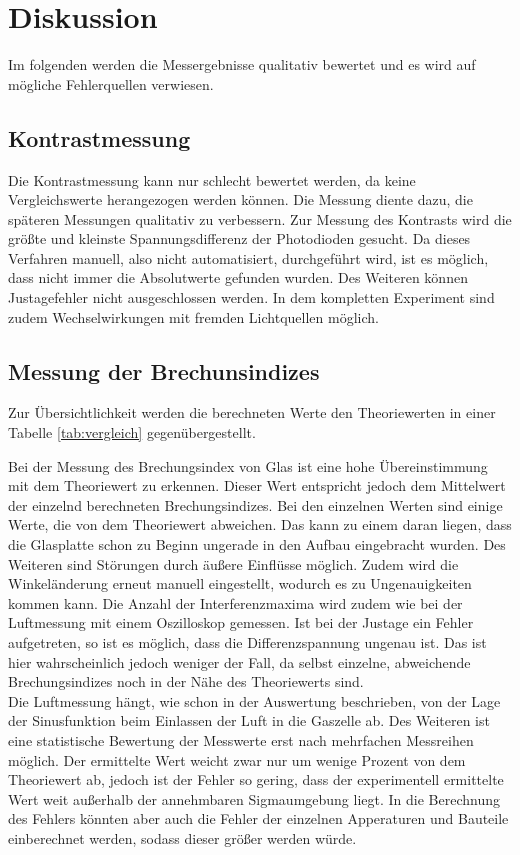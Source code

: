\section{Diskussion}
Im folgenden werden die Messergebnisse qualitativ bewertet und es wird auf
mögliche Fehlerquellen verwiesen.
\subsection{Kontrastmessung}
Die Kontrastmessung kann nur schlecht bewertet werden, da keine Vergleichswerte
herangezogen werden können. Die Messung diente dazu, die späteren Messungen
qualitativ zu verbessern. Zur Messung des Kontrasts wird die größte und kleinste
Spannungsdifferenz der Photodioden gesucht. Da dieses Verfahren manuell, also
nicht automatisiert, durchgeführt wird, ist es möglich, dass nicht immer die
Absolutwerte gefunden wurden. Des Weiteren können Justagefehler nicht
ausgeschlossen werden. In dem kompletten Experiment sind zudem
Wechselwirkungen mit fremden Lichtquellen möglich.

\subsection{Messung der Brechunsindizes}
Zur Übersichtlichkeit werden die berechneten Werte den Theoriewerten in einer
Tabelle \ref{tab:vergleich} gegenübergestellt.



Bei der Messung des Brechungsindex von Glas ist eine hohe Übereinstimmung mit
dem Theoriewert zu erkennen. Dieser Wert entspricht jedoch dem Mittelwert der
einzelnd berechneten Brechungsindizes. Bei den einzelnen Werten sind einige
Werte, die von dem Theoriewert abweichen. Das kann zu einem daran liegen, dass
die Glasplatte schon zu Beginn ungerade in den Aufbau eingebracht wurden. Des
Weiteren sind Störungen durch äußere Einflüsse möglich. Zudem wird die
Winkeländerung erneut manuell eingestellt, wodurch es zu Ungenauigkeiten
kommen kann.
Die Anzahl der Interferenzmaxima wird zudem wie bei der Luftmessung mit einem
Oszilloskop gemessen. Ist bei der Justage ein Fehler aufgetreten, so ist es
möglich, dass die Differenzspannung ungenau ist. Das ist hier wahrscheinlich
jedoch weniger der Fall, da selbst einzelne, abweichende Brechungsindizes noch
in der Nähe des Theoriewerts sind. \\

Die Luftmessung hängt, wie schon in der Auswertung beschrieben, von der Lage
der Sinusfunktion beim Einlassen der Luft in die Gaszelle ab. Des Weiteren
ist eine statistische Bewertung der Messwerte erst nach mehrfachen
Messreihen möglich. Der ermittelte Wert weicht zwar nur um wenige Prozent
von dem Theoriewert ab, jedoch ist der Fehler so gering, dass der experimentell
ermittelte Wert weit außerhalb der annehmbaren Sigmaumgebung liegt. In die
Berechnung des Fehlers könnten aber auch die Fehler der einzelnen Apperaturen
und Bauteile einberechnet werden, sodass dieser größer werden würde.
